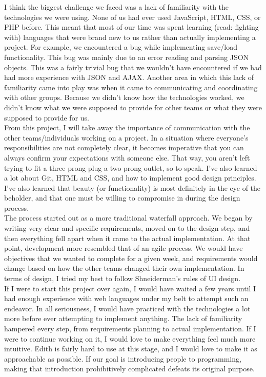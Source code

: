 \documentclass[12pt]{article}
\begin{document}
I think the biggest challenge we faced was a lack of familiarity with the technologies we were using. None of us had ever used JavaScript, HTML, CSS, or PHP before. This meant that most of our time was spent learning (read: fighting with) languages that were brand new to us rather than actually implementing a project. For example, we encountered a bug while implementing save/load functionality. This bug was mainly due to an error reading and parsing JSON objects. This was a fairly trivial bug that we wouldn't have encountered if we had had more experience with JSON and AJAX. Another area in which this lack of familiarity came into play was when it came to communicating and coordinating with other groups. Because we didn't know how the technologies worked, we didn't know what we were supposed to provide for other teams or what they were supposed to provide for us.\\

From this project, I will take away the importance of communication with the other teams/individuals working on a project. In a situation where everyone's responsibilities are not completely clear, it becomes imperative that you can always confirm your expectations with someone else. That way, you aren't left trying to fit a three prong plug a two prong outlet, so to speak. I've also learned a lot about Git, HTML and CSS, and how to implement good design principles. I've also learned that beauty (or functionality) is most definitely in the eye of the beholder, and that one must be willing to compromise in during the design process.\\

The process started out as a more traditional waterfall approach. We began by writing very clear and specific requirements, moved on to the design step, and then everything fell apart when it came to the actual implementation. At that point, development more resembled that of an agile process. We would have objectives that we wanted to complete for a given week, and requirements would change based on how the other teams changed their own implementation. In terms of design, I tried my best to follow Shneiderman's rules of UI design.\\

If I were to start this project over again, I would have waited a few years until I had enough experience with web languages under my belt to attempt such an endeavor. In all seriousness, I would have practiced with the technologies a lot more before ever attempting to implement anything. The lack of familiarity hampered every step, from requirements planning to actual implementation. If I were to continue working on it, I would love to make everything feel much more intuitive. Edith is fairly hard to use at this stage, and I would love to make it as approachable as possible. If our goal is introducing people to programming, making that introduction prohibitively complicated defeats its original purpose.
\end{document}
